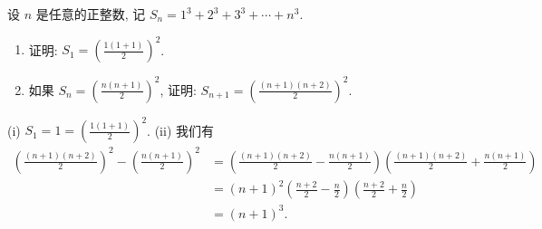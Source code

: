 \begin{prob}
\label{prob:prob-5}
设 $n$ 是任意的正整数, 记
$S_n = 1^3 + 2^3 + 3^3 + \cdots + n^3$.
\begin{enumerate}[label={(\roman*)}]
  \item 证明: $S_1 = (\frac{1(1 + 1)}{2})^2$.
  \item 如果 $S_n = (\frac{n(n+1)}{2})^2$, 证明:
    $S_{n+1} = (\frac{(n+1)(n+2)}{2})^2$.
\end{enumerate}
\end{prob}

\begin{soln}
(i) $S_1 = 1 = (\frac{1(1+1)}{2})^2$.
(ii) 我们有
\begin{align*}
\left(\frac{(n+1)(n+2)}{2}\right)^2
-
\left(\frac{n(n+1)}{2}\right)^2
&=
\left(\frac{(n+1)(n+2)}{2} - \frac{n(n+1)}{2}\right)
\left(\frac{(n+1)(n+2)}{2} + \frac{n(n+1)}{2}\right) \\
&=
(n+1)^2\left(\frac{n+2}{2} - \frac{n}{2}\right)
\left(\frac{n+2}{2} + \frac{n}{2}\right) \\
&=
(n+1)^3.
\end{align*}
\end{soln}
